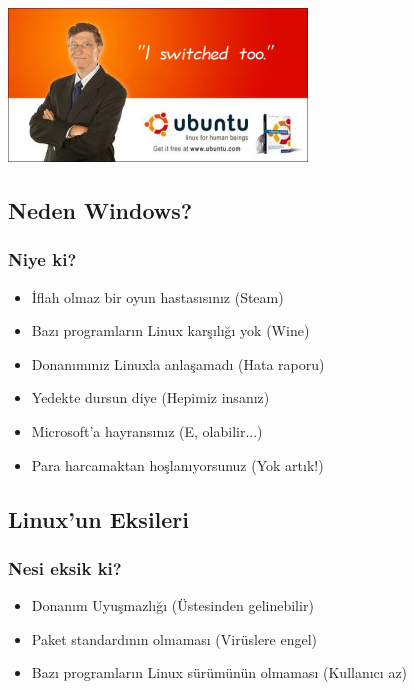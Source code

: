 \documentclass{beamer}
\begin{document}
		\begin{frame}
		 \begin{center}
			 \includegraphics{img/bgl.png}
		\end{center}
		
		\end{frame}

	\subsection{Neden Windows?}
		\begin{frame}
		 	\frametitle{Niye ki?}
			\begin{itemize}[<+->]
			 \item İflah olmaz bir oyun hastasısınız (Steam)
			 \item Bazı programların Linux karşılığı yok (Wine)
			 \item Donanımınız Linuxla anlaşamadı (Hata raporu)
			 \item Yedekte dursun diye (Hepimiz insanız)
			 \item Microsoft'a hayransınız (E, olabilir...)
			 \item Para harcamaktan hoşlanıyorsunuz (Yok artık!)
			\end{itemize}

		\end{frame}
	
	\subsection {Linux'un Eksileri}
		\begin{frame}
			\frametitle{Nesi eksik ki?}
			\begin{itemize}[<+->]
			 \item Donanım Uyuşmazlığı (Üstesinden gelinebilir)
			 \item Paket standardının olmaması (Virüslere engel)
			 \item Bazı programların Linux sürümünün olmaması (Kullanıcı az)
			\end{itemize}

		\end{frame}
\end{document}

